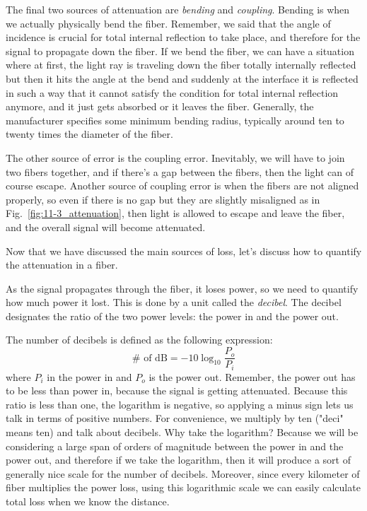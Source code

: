The final two sources of attenuation are \emph{bending} and \emph{coupling}. Bending is when we actually physically bend the fiber. Remember, we said that the angle of incidence is crucial for total internal reflection to take place, and therefore for the signal to propagate down the fiber. If we bend the fiber, we can have a situation where at first, the light ray is traveling down the fiber totally internally reflected but then it hits the angle at the bend and suddenly at the interface it is reflected in such a way that it cannot satisfy the condition for total internal reflection anymore, and it just gets absorbed or it leaves the fiber.  Generally, the manufacturer specifies some minimum bending radius, typically around ten to twenty times the diameter of the fiber.

The other source of error is the coupling error. Inevitably, we will have to join two fibers together, and if there's a gap between the fibers, then the light can of course escape. Another source of coupling error is when the fibers are not aligned properly, so even if there is no gap but they are slightly misaligned as in Fig.~\ref{fig:11-3_attenuation}, then light is allowed to escape and leave the fiber, and the overall signal will become attenuated.

Now that we have discussed the main sources of loss, let's discuss how to quantify the attenuation in a fiber.

As the signal propagates through the fiber, it loses power, so we need to quantify how much power it lost. This is done by a unit called the \emph{decibel}. The decibel designates the ratio of the two power levels: the power in and the power out.

The number of decibels is defined as the following expression:
\begin{equation}
\# \text { of } \mathrm{dB}=-10 \log _{10} \frac{P_o}{P_i}
\label{eq:decibels}
\end{equation}
where $P_i$ in the power in and $P_o$ is the power out. Remember, the power out has to be less than power in, because the signal is getting attenuated.  Because this ratio is less than one, the logarithm is negative, so applying a minus sign lets us talk in terms of positive numbers. For convenience, we multiply by ten ("deci" means ten) and talk about decibels. Why take the logarithm? Because we will be considering a large span of orders of magnitude between the power in and the power out, and therefore if we take the logarithm, then it will produce a sort of generally nice scale for the number of decibels.  Moreover, since every kilometer of fiber multiplies the power loss, using this logarithmic scale we can easily calculate total loss when we know the distance.

